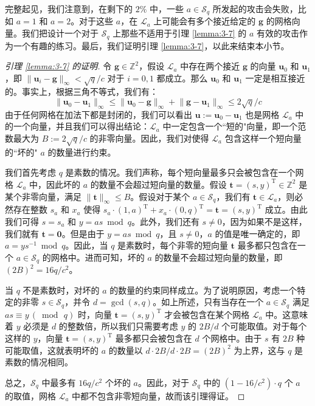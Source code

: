 完整起见，我们注意到，在剩下的 $2\%$ 中，一些 $a\in\mathcal{S}_q$ 所发起的攻击会失败，比如 $a=1$ 和 $a=2$。对于这些 $a$，在 $\mathcal{L}_a$ 上可能会有多个接近给定的 $\boldsymbol{g}$ 的网格向量。我们把设计一个对于 $\mathcal{S}_q$ 上那些不适用于引理 \ref{lemma:3-7} 的 $a$ 有效的攻击作为一个有趣的练习。最后，我们证明引理 \ref{lemma:3-7}，以此来结束本小节。

\begin{proof}[引理 \ref{lemma:3-7} 的证明]
令 $\boldsymbol{g}\in\mathbb{Z}^2$，假设 $\mathcal{L}_a$ 中存在两个接近 $\boldsymbol{g}$ 的向量 $\boldsymbol{u}_0$ 和 $\boldsymbol{u}_1$，即 $\lVert\boldsymbol{u}_i-\boldsymbol{g}\rVert_\infty<\sqrt{q}/c$ 对于 $i=0,1$ 都成立。那么 $\boldsymbol{u}_0$ 和 $\boldsymbol{u}_1$ 一定是相互接近的。事实上，根据三角不等式，我们有：
\[
\lVert\boldsymbol{u}_0-\boldsymbol{u}_1\rVert_\infty
\leq
\lVert\boldsymbol{u}_0-\boldsymbol{g}\rVert_\infty
+\lVert\boldsymbol{g}-\boldsymbol{u}_1\rVert_\infty
\leq
2\sqrt{q}/c
\]
由于任何网格在加法下都是封闭的，我们可以看出 $\boldsymbol{u}:=\boldsymbol{u}_0-\boldsymbol{u}_1$ 也是网格 $\mathcal{L}_a$ 中的一个向量，并且我们可以得出结论：$\mathcal{L}_a$ 中一定包含一个``短的"向量，即一个范数最大为 $B:= 2\sqrt{q}/c$ 的非零向量。因此，我们对使得 $\mathcal{L}_a$ 包含这样一个短向量的``坏的" $a$ 的数量进行约束。

我们首先考虑 $q$ 是素数的情况。我们声称，每个短向量最多只会被包含在一个网格 $\mathcal{L}_a$ 中，因此坏的 $a$ 的数量不会超过短向量的数量。假设 $\boldsymbol{t}=(s,y)^\mathrm{T}\in\mathbb{Z}^2$ 是某个非零向量，满足 $\lVert\boldsymbol{t}\rVert_\infty\leq B$。假设对于某个 $a\in\mathcal{S}_q$，我们有 $\boldsymbol{t}\in\mathcal{L}_a$，则必然存在整数 $s_a$ 和 $x_a$ 使得 $s_a\cdot(1,a)^\mathrm{T}+x_a\cdot(0,q)^\mathrm{T}=\boldsymbol{t}=(s,y)^\mathrm{T}$ 成立。由此我们可得 $s=s_a$ 和 $y=as\bmod q$。此外，我们还有 $s\neq0$，因为如果不是这样，我们就有 $\boldsymbol{t}=\boldsymbol{0}$。但是由于 $y=as\bmod q$，且 $s\neq0$，$a$ 的值是唯一确定的，即 $a=ys^{-1}\bmod q$。因此，当 $q$ 是素数时，每个非零的短向量 $\boldsymbol{t}$ 最多都只包含在一个 $a\in\mathcal{S}_q$ 的网格中。进而可知，坏的 $a$ 的数量不会超过短向量的数量，即 $(2B)^2=16q/c^2$。

当 $q$ 不是素数时，对坏的 $a$ 的数量的约束同样成立。为了说明原因，考虑一个特定的非零 $s\in\mathcal{S}_q$，并令 $d=\gcd(s, q)$。如上所述，只有当存在一个 $a\in\mathcal{S}_q$ 满足 $as\equiv y\,(\bmod\,q)$ 时，向量 $\boldsymbol{t}=(s,y)^\mathrm{T}$ 才会被包含在某个网格 $\mathcal{L}_a$ 中。这意味着 $y$ 必须是 $d$ 的整数倍，所以我们只需要考虑 $y$ 的 $2B/d$ 个可能取值。对于每个这样的 $y$，向量 $\boldsymbol{t}=(s,y)^\mathrm{T}$ 最多都只会被包含在 $d$ 个网格中。由于 $s$ 有 $2B$ 种可能取值，这就表明坏的 $a$ 的数量以 $d\cdot 2B/d \cdot 2B=(2B)^2$ 为上界，这与 $q$ 是素数的情况相同。

总之，$\mathcal{S}_q$ 中最多有 $16q/c^2$ 个坏的 $a$。因此，对于 $\mathcal{S}_q$ 中的 $(1-16/c^2)\cdot q$ 个 $a$ 的取值，网格 $\mathcal{L}_a$ 中都不包含非零短向量，故而该引理得证。
\end{proof}

